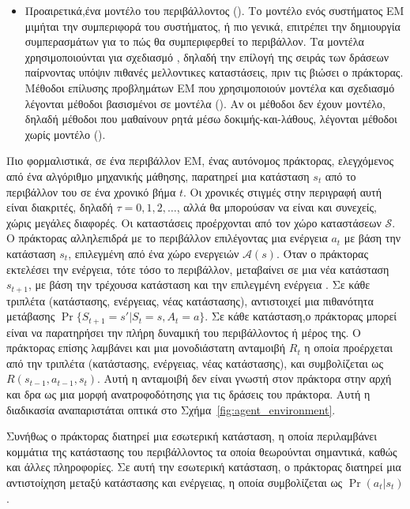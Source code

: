 \begin{itemize}
    \item Προαιρετικά,ένα μοντέλο του περιβάλλοντος (). Το μοντέλο ενός συστήματος ΕΜ μιμήται την
          συμπεριφορά του συστήματος, ή πιο γενικά, επιτρέπει την δημιουργία συμπερασμάτων για το πώς θα
          συμπεριφερθεί το περιβάλλον. Τα μοντέλα χρησιμοποιούνται για σχεδιασμό , δηλαδή την επίλογή της
          σειράς των δράσεων παίρνοντας υπόψιν πιθανές μελλοντικες καταστάσεις, πριν τις βιώσει ο πράκτορας.
          Μέθοδοι επίλυσης προβλημάτων ΕΜ που χρησιμοποιούν μοντέλα και σχεδιασμό λέγονται μέθοδοι βασισμένοι
          σε μοντέλα (). Αν οι μέθοδοι δεν έχουν μοντέλο, δηλαδή μέθοδοι που μαθαίνουν ρητά μέσω
          δοκιμής-και-λάθους, λέγονται μέθοδοι χωρίς μοντέλο ().
\end{itemize}

Πιο φορμαλιστικά, σε ένα περιβάλλον ΕΜ, ένας αυτόνομος πράκτορας, ελεγχόμενος από ένα αλγόριθμο μηχανικής μάθησης,
παρατηρεί μια κατάσταση $s_t$ από το περιβάλλον του σε ένα χρονικό βήμα $t$. Οι χρονικές στιγμές στην περιγραφή αυτή είναι διακριτές,
δηλαδή $τ=0,1,2,\ldots$, αλλά θα μπορούσαν να είναι και συνεχείς, χώρις μεγάλες διαφορές. Οι καταστάσεις προέρχονται από τον
χώρο καταστάσεων $\mathcal{S}$. Ο πράκτορας αλληλεπιδρά με το περιβάλλον επιλέγοντας μια ενέργεια $a_t$ με βάση την κατάσταση
$s_t$, επιλεγμένη από ένα χώρο ενεργειών $\mathcal{A}(s)$. Όταν ο πράκτορας εκτελέσει την ενέργεια, τότε τόσο το περιβάλλον,
μεταβαίνει σε μια νέα κατάσταση $s_{t+1}$, με βάση την τρέχουσα κατάσταση και την επιλεγμένη
ενέργεια \cite{drlbs}. Σε κάθε τριπλέτα (κατάστασης, ενέργειας, νέας κατάστασης), αντιστοιχεί μια πιθανότητα μετάβασης
$\Pr{\{S_{t+1}=s'|S_t=s, A_{t}=a\}}$. Σε κάθε κατάσταση,ο πράκτορας μπορεί είναι να παρατηρήσει την πλήρη δυναμική του
περιβάλλοντος ή μέρος της. Ο πράκτορας επίσης λαμβάνει και μια μονοδιάστατη ανταμοιβή $R_t$
η οποία προέρχεται από την τριπλέτα (κατάστασης, ενέργειας, νέας κατάστασης), και συμβολίζεται ως
$R(s_{t-1}, a_{t-1}, s_t)$. Αυτή η ανταμοιβή δεν είναι γνωστή στον πράκτορα στην αρχή και
δρα ως μια μορφή ανατροφοδότησης για τις δράσεις του πράκτορα.
Αυτή η διαδικασία αναπαριστάται οπτικά στο Σχήμα~\ref{fig:agent_environment}.


Συνήθως ο πράκτορας διατηρεί μια εσωτερική κατάσταση, η οποία περιλαμβάνει κομμάτια της κατάστασης του περιβάλλοντος τα οποία θεωρούνται
σημαντικά, καθώς και άλλες πληροφορίες. Σε αυτή την εσωτερική κατάσταση, ο πράκτορας
διατηρεί μια αντιστοίχηση μεταξύ κατάστασης και ενέργειας, η οποία συμβολίζεται ως $\Pr(a_t | s_t)$.

